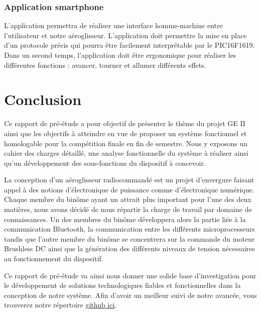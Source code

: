 \documentclass[a4paper,12pt]{report}
\begin{document}
			\vspace{-1em}
			
			\subsubsection{Application smartphone}
			\vspace{-1em}			
			L'application permettra de réaliser une interface homme-machine entre l'utilisateur et notre aéroglisseur. L'application doit permettre la mise en place d'un protocole précis qui pourra être facilement interprétable par le PIC16F1619. Dans un second temps, l'application doit être ergonomique pour réaliser les différentes fonctions : avancer, tourner et allumer différents effets.
	
	\section{Conclusion}
	
	\vspace{-1em}
	
	Ce rapport de pré-étude a pour objectif de présenter le thème du projet GE II ainsi que les objectifs à atteindre en vue de proposer un système fonctionnel et homologable pour la compétition finale en fin de semestre. Nous y exposons un cahier des charges détaillé, une analyse fonctionnelle du système à réaliser ainsi qu'un développement des sous-fonctions du dispositif à concevoir.
	
	La conception d'un aéroglisseur radiocommandé est un projet d'envergure faisant appel à des notions d'électronique de puissance comme d'électronique numérique. Chaque membre du binôme ayant un attrait plus important pour l'une des deux matières, nous avons décidé de nous répartir la charge de travail par domaine de connaissances. Un des membres du binôme développera alors la partie liée à la communication Bluetooth, la communication entre les différents microprocesseurs tandis que l'autre membre du binôme se concentrera sur la commande du moteur Brushless DC ainsi que la génération des différents niveaux de tension nécessaires au fonctionnement du dispositif.
	
	Ce rapport de pré-étude va ainsi nous donner une solide base d'investigation pour le développement de solutions technologiques fiables et fonctionnelles dans la conception de notre système. Afin d'avoir un meilleur suivi de notre avancée, vous trouverez notre répertoire \href{https://github.com/tristanplouz/ProjetGE2}{github ici}.
	
	\listoffigures
	
	 
	
	
\end{document}
